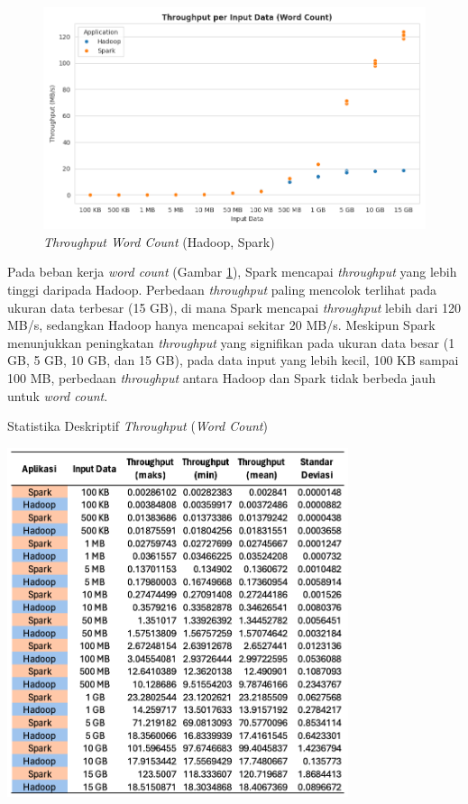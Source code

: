 \begin{figure}[h]
    \centering
    \includegraphics[width=1\textwidth]{figures/ch04/1-throughput-wordcount.png}
    \caption{\textit{Throughput Word Count} (Hadoop, Spark)}
    \label{fig:throughput-wordcount}
\end{figure}

Pada beban kerja \textit{word count} (Gambar \ref{fig:throughput-wordcount}), Spark mencapai \textit{throughput} yang lebih tinggi daripada Hadoop. Perbedaan \textit{throughput} paling mencolok terlihat pada ukuran data terbesar (15 GB), di mana Spark mencapai \textit{throughput} lebih dari 120 MB/s, sedangkan Hadoop hanya mencapai sekitar 20 MB/s. Meskipun Spark menunjukkan peningkatan \textit{throughput} yang signifikan pada ukuran data besar (1 GB, 5 GB, 10 GB, dan 15 GB), pada data input yang lebih kecil, 100 KB sampai 100 MB, perbedaan \textit{throughput} antara Hadoop dan Spark tidak berbeda jauh untuk \textit{word count}.

\begin{table}[h]
  \centering
  \caption{Statistika Deskriptif \textit{Throughput} (\textit{Word Count})}
  \includegraphics[width=0.75\textwidth]{figures/ch04/4-wc-th-table}
  \label{table:4-wc-th-table}
\end{table}

